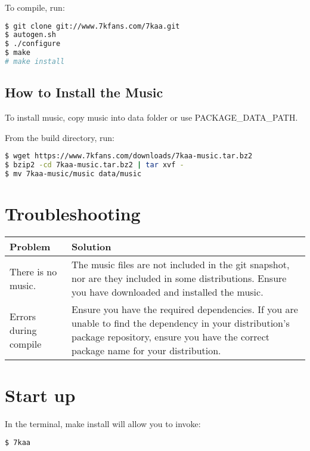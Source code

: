 To compile, run:

\begin{lstlisting}[language=bash]
$ git clone git://www.7kfans.com/7kaa.git
$ autogen.sh
$ ./configure
$ make
# make install
\end{lstlisting}


\subsection{How to Install the Music}

To install music, copy music into data folder or use PACKAGE\_DATA\_PATH.

From the build directory, run:

\begin{lstlisting}[language=bash]
$ wget https://www.7kfans.com/downloads/7kaa-music.tar.bz2
$ bzip2 -cd 7kaa-music.tar.bz2 | tar xvf -
$ mv 7kaa-music/music data/music
\end{lstlisting}

\section{Troubleshooting}

\begin{tabular}{ | l | p{6cm} |}
	\hline
	Problem	& Solution \\ \hline
There is no music. & The music files are not included in the git snapshot, nor are they included in some distributions. Ensure you have downloaded and installed the music. \\ \hline
Errors during compile & Ensure you have the required dependencies. If you are unable to find the dependency in your distribution's package repository, ensure you have the correct package name for your distribution. \\
 \hline
\end{tabular}

\section{Start up}

In the terminal, make install will allow you to invoke:

\begin{lstlisting}[language=bash] 
$ 7kaa
\end{lstlisting}

